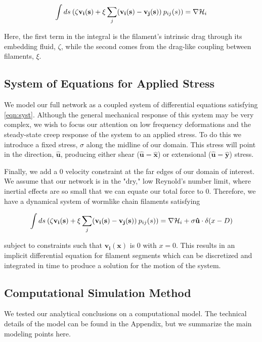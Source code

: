 \documentclass[pre,reprint]{revtex4-1}
\begin{document}
\begin{equation}
\label{eqn:syst}
\int ds \: (\mathbf{\zeta v_i(s)} + \xi \sum _j(\mathbf{v_i(s)}-\mathbf{v_j(s)}) \: p_{ij}(s))= \nabla {\cal H}_i
\end{equation}

Here, the first term in the integral is the filament's intrinsic drag through its embedding fluid, $\zeta$, while the second comes from the drag-like coupling between filaments, $\xi$.  


\subsection{System of Equations for Applied Stress}
We model our full network as a coupled system of differential equations satisfying \ref{eqn:syst}.  Although the general mechanical response of this system may be very complex, we wish to focus our attention on low frequency deformations and the steady-state creep response of the system to an applied stress.  To do this we introduce a fixed stress, $\sigma$ along the midline of our domain.  This stress will point in the direction, $\mathbf{\hat{u}}$, producing either shear ($\mathbf{\hat{u}}=\mathbf{\hat{x}}$) or extensional ($\mathbf{\hat{u}}=\mathbf{\hat{y}}$) stress.

Finally, we add a 0 velocity constraint at the far edges of our domain of interest.  We assume that our network is in the "dry," low Reynold's number limit, where inertial effects are so small that we can equate our total force to 0.  Therefore, we have a dynamical system of wormlike chain filaments satisfying 

\begin{equation}
\int ds \: (\zeta\mathbf{v_i(s)} + \xi \sum _j(\mathbf{v_i(s)}-\mathbf{v_j(s)}) \: p_{ij}(s)) = \nabla {\cal H}_i + \sigma\mathbf{\hat{u}}\cdot\delta(x-D)
\end{equation}

subject to constraints such that $\mathbf{v_i(x)}$ is 0 with $x=0$.  This results in an implicit differential equation for filament segments which can be discretized and integrated in time to produce a solution for the motion of the system.


\subsection{Computational Simulation Method}

We tested our analytical conclusions on a computational model.  The technical details of the model can be found in the Appendix, but we summarize the main modeling points here.
\end{document}
